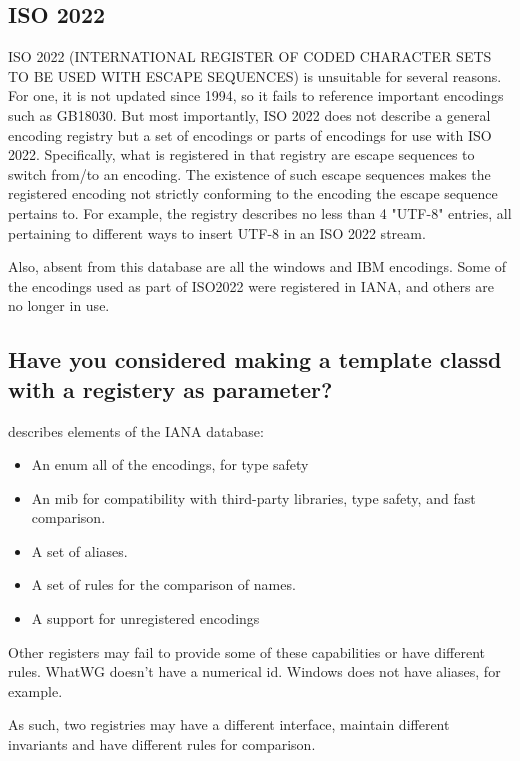 \documentclass{wg21}
\begin{document}
\subsection{ISO 2022}

ISO 2022 (INTERNATIONAL REGISTER OF CODED CHARACTER SETS TO BE USED WITH ESCAPE SEQUENCES) is unsuitable for several reasons.
For one, it is not updated since 1994, so it fails to reference important encodings such as GB18030.
But most importantly, ISO 2022 does not describe a general encoding registry but a set of encodings or parts of encodings for use with ISO 2022.
Specifically, what is registered in that registry are escape sequences to switch from/to an encoding.
The existence of such escape sequences makes the registered encoding not strictly conforming to the encoding the escape sequence pertains to.
For example, the registry describes no less than 4 "UTF-8" entries, all pertaining to different ways to insert UTF-8 in an ISO 2022 stream.

Also, absent from this database are all the windows and IBM encodings.
Some of the encodings used as part of ISO2022 were registered in IANA, and others are no longer in use.

\subsection{Have you considered making  a template classd with a registery as parameter?}

 describes elements of the IANA database:

\begin{itemize}
\item An enum all of the encodings, for type safety
\item An mib for compatibility with third-party libraries, type safety, and fast comparison.
\item A set of aliases.
\item A set of rules for the comparison of names.
\item A support for unregistered encodings
\end{itemize}

Other registers may fail to provide some of these capabilities or have different rules.
WhatWG doesn't have a numerical id. Windows does not have aliases, for example.

As such, two registries may have a different interface, maintain different invariants and have different rules for comparison.
\end{document}

